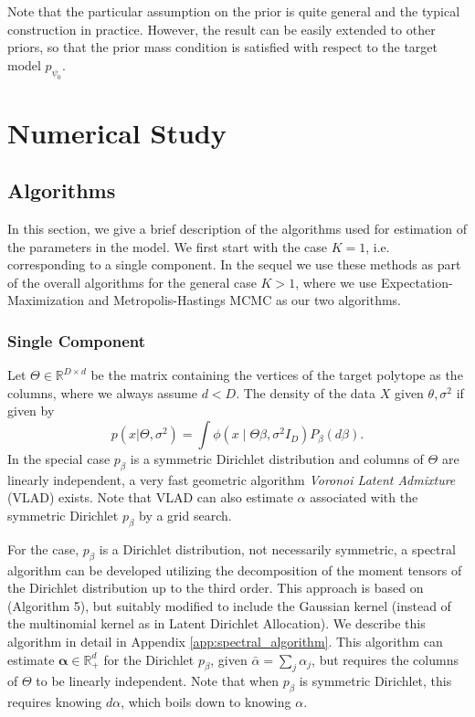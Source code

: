 \documentclass[bj,authoryear]{imsart}
\theoremstyle{plain}
\theoremstyle{remark}
\def\balpha{{\boldsymbol\alpha}}
\def\bbR{\mathbb{R}}
\begin{document}
Note that the particular assumption on the prior is quite general and the typical construction in practice. However, the result can be easily extended to other priors, so that the prior mass condition is satisfied with respect to the target model $p_{\psi_0}$. 

\section{Numerical Study}\label{sec:numerical study}

\subsection{Algorithms}\label{sec:algorithm}
In this section, we give a brief description of the algorithms used for estimation of the parameters in the model. We first start with the case $K=1$, i.e. corresponding to a single component. In the sequel we use these methods as part of the overall algorithms for the general case $K>1$, where we use Expectation-Maximization and Metropolis-Hastings MCMC as our two algorithms.

\subsubsection{Single Component}
Let $\Theta\in \bbR^{D\times d}$ be the matrix containing the vertices of the target polytope as the columns, where we always assume $d<D$. The density of the data $X$ given $\theta, \sigma^2$ if given by
$$p(x|\Theta,\sigma^2) = \int \phi(x\mid \Theta\beta, \sigma^2 I_D)P_{\beta}(d\beta).$$
In the special case $p_{\beta}$ is a symmetric Dirichlet distribution and columns of $\Theta$ are linearly independent, a very fast geometric algorithm \textit{Voronoi Latent Admixture} (VLAD) \citep{yurochkin2019dirichlet} exists. Note that VLAD can also estimate $\alpha$ associated with the symmetric Dirichlet $p_{\beta}$ by a grid search.

For the case, $p_{\beta}$ is a Dirichlet distribution, not necessarily symmetric, a spectral algorithm can be developed utilizing the decomposition of the moment tensors of the Dirichlet distribution \citep{do2025dirichlet} up to the third order. This approach is based on \cite{anandkumar2012spectral} (Algorithm 5), but suitably modified to include the Gaussian kernel (instead of the multinomial kernel as in Latent Dirichlet Allocation). We describe this algorithm in detail in Appendix \ref{app:spectral_algorithm}. This algorithm can estimate $\balpha\in\bbR_+^d$ for the Dirichlet $p_{\beta}$, given $\bar{\alpha}=\sum_j \alpha_j$, but requires the columns of $\Theta$ to be linearly independent. Note that when $p_{\beta}$ is symmetric Dirichlet, this requires knowing $d\alpha$, which boils down to knowing $\alpha$.
\end{document}
